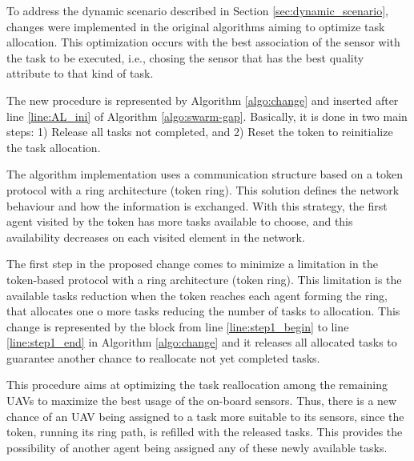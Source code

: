 
To address the dynamic scenario described in Section \ref{sec:dynamic_scenario}, changes were implemented in the original algorithms aiming to optimize task allocation. This optimization occurs with the best association of the sensor with the task to be executed, i.e., chosing the sensor that has the best quality attribute to that kind of task. 

The new procedure is represented by Algorithm \ref{algo:change} and inserted after line \ref{line:AL_ini} of Algorithm \ref{algo:swarm-gap}. Basically, it is done in two main steps: 1) Release all tasks not completed, and 2) Reset the token to reinitialize the task allocation. 

The algorithm implementation uses a communication structure based on a token protocol with a ring architecture (token ring). This solution defines the network behaviour and how the information is exchanged. With this strategy, the first agent visited by the token has more tasks available to choose, and this availability decreases on each visited element in the network.

The first step in the proposed change comes to minimize a limitation in the token-based protocol with a ring architecture (token ring). This limitation is the available tasks reduction when the token reaches each agent forming the ring, that allocates one o more tasks reducing the number of tasks to allocation. This change is represented by the block from line \ref{line:step1_begin} to line \ref{line:step1_end} in Algorithm \ref{algo:change} and it releases all allocated tasks to guarantee another chance to reallocate not yet completed tasks.

This procedure aims at optimizing the task reallocation among the remaining UAVs to maximize the best usage of the on-board sensors. Thus, there is a new chance of an UAV being assigned to a task more suitable to its sensors, since the token, running its ring path, is refilled with the released tasks. This provides the possibility of another agent being assigned any of these newly available tasks.

